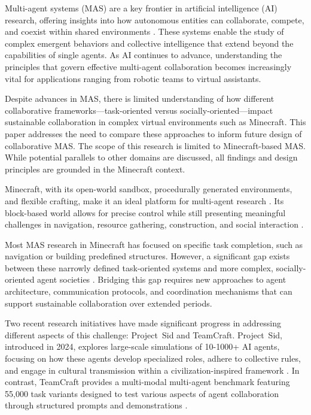 \documentclass[a4paper, 12pt]{article}
\begin{document}
Multi-agent systems (MAS) are a key frontier in artificial intelligence (AI) research, offering insights into how autonomous entities can collaborate, compete, and coexist within shared environments \autocite{Leeuwen2021, Shu2024}. These systems enable the study of complex emergent behaviors and collective intelligence that extend beyond the capabilities of single agents. As AI continues to advance, understanding the principles that govern effective multi-agent collaboration becomes increasingly vital for applications ranging from robotic teams to virtual assistants.

Despite advances in MAS, there is limited understanding of how different collaborative frameworks---task-oriented versus socially-oriented---impact sustainable collaboration in complex virtual environments such as Minecraft. This paper addresses the need to compare these approaches to inform future design of collaborative MAS. The scope of this research is limited to Minecraft-based MAS. While potential parallels to other domains are discussed, all findings and design principles are grounded in the Minecraft context.

Minecraft, with its open-world sandbox, procedurally generated environments, and flexible crafting, make it an ideal platform for multi-agent research \autocite{Fan2022}. Its block-based world allows for precise control while still presenting meaningful challenges in navigation, resource gathering, construction, and social interaction \autocite{Zhao2024}.

Most MAS research in Minecraft has focused on specific task completion, such as navigation or building predefined structures. However, a significant gap exists between these narrowly defined task-oriented systems and more complex, socially-oriented agent societies \autocite{Shu2024, Qiu2024}. Bridging this gap requires new approaches to agent architecture, communication protocols, and coordination mechanisms that can support sustainable collaboration over extended periods.

Two recent research initiatives have made significant progress in addressing different aspects of this challenge: Project~Sid and TeamCraft. Project~Sid, introduced in 2024, explores large-scale simulations of 10-1000+ AI agents, focusing on how these agents develop specialized roles, adhere to collective rules, and engage in cultural transmission within a civilization-inspired framework \autocite{Altera2024}. In contrast, TeamCraft provides a multi-modal multi-agent benchmark featuring 55,000 task variants designed to test various aspects of agent collaboration through structured prompts and demonstrations \autocite{Long2024}.
\end{document}
